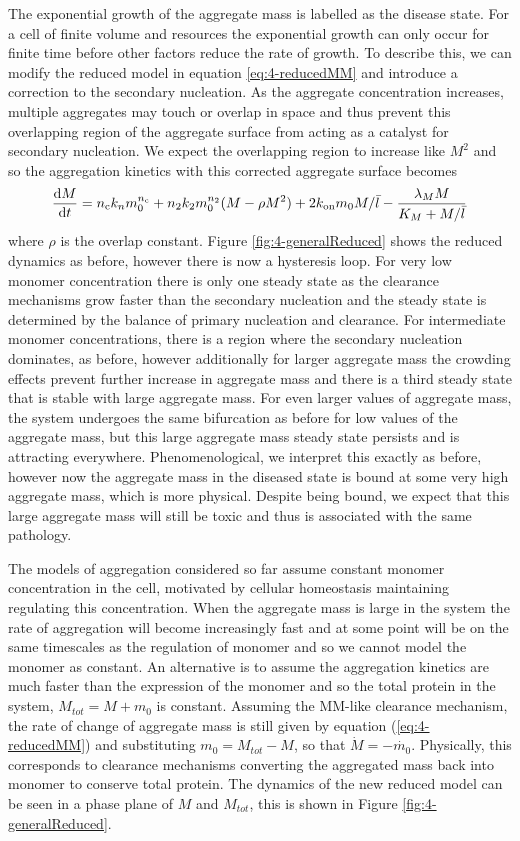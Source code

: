 The exponential growth of the aggregate mass is labelled as the disease state. For a cell of finite volume and resources the exponential growth can only occur for finite time before other factors reduce the rate of growth. To describe this, we can modify the reduced model in equation \ref{eq:4-reducedMM} and introduce a correction to the secondary nucleation. As the aggregate concentration increases, multiple aggregates may touch or overlap in space and thus prevent this overlapping region of the aggregate surface from acting as a catalyst for secondary nucleation. We expect the overlapping region to increase like $M^2$ and so the aggregation kinetics with this corrected aggregate surface becomes
\begin{equation}
\frac{\text{d}M}{\text{d}t}= n_{\mathrm{c}} k_n m_0^{n_{\mathrm{c}}} + n_2 k_2 m_0^{n_2} (M- \rho M^2) + 2 k_\text{on} m_0 M/\bar{l} - \frac{\lambda_M M}{K_M+M/\bar{l}}
\end{equation}
where $\rho$ is the overlap constant. Figure \ref{fig:4-generalReduced}  shows the reduced dynamics as before, however there is now a hysteresis loop. For very low monomer concentration there is only one steady state as the clearance mechanisms grow faster than the secondary nucleation and the steady state is determined by the balance of primary nucleation and clearance. For intermediate monomer concentrations, there is a region where the secondary nucleation dominates, as before, however additionally for larger aggregate mass the crowding effects prevent further increase in aggregate mass and there is a third steady state that is stable with large aggregate mass. For even larger values of aggregate mass, the system undergoes the same bifurcation as before for low values of the aggregate mass, but this large aggregate mass steady state persists and is attracting everywhere. Phenomenological, we interpret this exactly as before, however now the aggregate mass in the diseased state is bound at some very high aggregate mass, which is more physical. Despite being bound, we expect that this large aggregate mass will still be toxic and thus is associated with the same pathology.

The models of aggregation considered so far assume constant monomer concentration in the cell, motivated by cellular homeostasis maintaining regulating this concentration. When the aggregate mass is large in the system the rate of aggregation will become increasingly fast and at some point will be on the same timescales as the regulation of monomer and so we cannot model the monomer as constant. An alternative is to assume the aggregation kinetics are much faster than the expression of the monomer and so the total protein in the system, $M_{tot} = M + m_0$ is constant. Assuming the MM-like clearance mechanism, the rate of change of aggregate mass is still given by equation (\ref{eq:4-reducedMM}) and substituting $m_0=M_{tot}-M$, so that $\dot{M}=-\dot{m_0}$. Physically, this corresponds to clearance mechanisms converting the aggregated mass back into monomer to conserve total protein. The dynamics of the new reduced model can be seen in a phase plane of $M$ and $M_{tot}$, this is shown in  Figure \ref{fig:4-generalReduced}.

